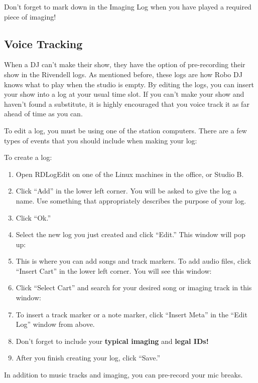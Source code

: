 \documentclass{witrman}
\begin{document}

Don't forget to mark down in the Imaging Log when you have played a required
piece of imaging!

\subsection{Voice Tracking}

When a DJ can't make their show, they have the option of pre-recording their
show in the Rivendell logs.  As mentioned before, these logs are how Robo DJ
knows what to play when the studio is empty. By editing the logs, you can insert
your show into a log at your usual time slot.  If you can't make your show and
haven't found a substitute, it is highly encouraged that you voice track it as
far ahead of time as you can.

To edit a log, you must be using one of the station computers.  There are a few
types of events that you should include when making your log:

\begin{skinnyitemize}
\end{skinnyitemize}

To create a log:
\begin{enumerate}
    \item Open RDLogEdit on one of the Linux machines in the office, or Studio
        B.
    \item Click ``Add'' in the lower left corner.  You will be asked to give the
        log a name.  Use something that appropriately describes the purpose of
        your log.
    \item Click ``Ok.''
    \item Select the new log you just created and click ``Edit.'' This window
        will pop up:

    \item This is where you can add songs and track markers.  To add audio
        files, click ``Insert Cart'' in the lower left corner.  You will see
        this window:

    \item Click ``Select Cart'' and search for your desired song or imaging
        track in this window:

    \item To insert a track marker or a note marker, click ``Insert Meta'' in
        the ``Edit Log'' window from above.
    \item Don't forget to include your \textbf{typical imaging} and
        \textbf{legal IDs!}
    \item After you finish creating your log, click ``Save.''
\end{enumerate}

In addition to music tracks and imaging, you can pre-record your mic breaks.

\makefooter{}
\end{document}
